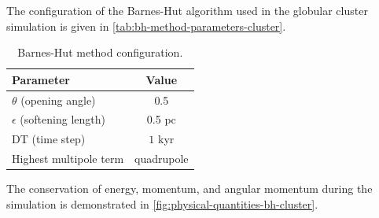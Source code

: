 The configuration of the Barnes-Hut algorithm used in the globular cluster simulation is given in \autoref{tab:bh-method-parameters-cluster}.
\begin{table}[htp]
    \centering
    \caption{Barnes-Hut method configuration.}
    \label{tab:bh-method-parameters-cluster}
    \begin{tabular}{lc}
        \toprule
        \textbf{Parameter}            & \textbf{Value} \\
        \midrule
        $\theta$ (opening angle)      & 0.5            \\
        $\epsilon$ (softening length) & 0.5 pc         \\
        DT (time step)                & $1$ kyr        \\
        Highest multipole term        & quadrupole     \\
        \bottomrule
    \end{tabular}
\end{table}
The conservation of energy, momentum, and angular momentum during the simulation is demonstrated in \autoref{fig:physical-quantities-bh-cluster}.
